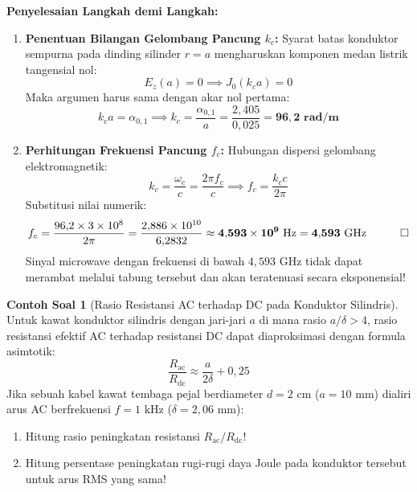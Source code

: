 \documentclass[11pt,a4paper]{article}
\theoremstyle{definition}
\newtheorem{example}{Contoh Soal}[section]
\begin{document}
\noindent\textbf{Penyelesaian Langkah demi Langkah:}
\begin{enumerate}[leftmargin=*]
    \item \textbf{Penentuan Bilangan Gelombang Pancung $k_c$:}
    Syarat batas konduktor sempurna pada dinding silinder $r = a$ mengharuskan komponen medan listrik tangensial nol:
    \begin{equation*}
        E_z(a) = 0 \implies J_0(k_c a) = 0
    \end{equation*}
    Maka argumen harus sama dengan akar nol pertama:
    \begin{equation*}
        k_c a = \alpha_{0,1} \implies k_c = \frac{\alpha_{0,1}}{a} = \frac{2{,}405}{0{,}025} = \mathbf{96{,}2\text{ rad/m}}
    \end{equation*}
    
    \item \textbf{Perhitungan Frekuensi Pancung $f_c$:}
    Hubungan dispersi gelombang elektromagnetik:
    \begin{equation*}
        k_c = \frac{\omega_c}{c} = \frac{2\pi f_c}{c} \implies f_c = \frac{k_c c}{2\pi}
    \end{equation*}
    Substitusi nilai numerik:
    \begin{equation*}
        f_c = \frac{96{,}2 \times 3 \times 10^8}{2\pi} = \frac{2{,}886 \times 10^{10}}{6{,}2832} \approx \mathbf{4{,}593 \times 10^9\text{ Hz} = 4{,}593\text{ GHz}} \quad \qed
    \end{equation*}
    Sinyal microwave dengan frekuensi di bawah $4{,}593\text{ GHz}$ tidak dapat merambat melalui tabung tersebut dan akan teratenuasi secara eksponensial!
\end{enumerate}

\begin{example}[Rasio Resistansi AC terhadap DC pada Konduktor Silindris]
Untuk kawat konduktor silindris dengan jari-jari $a$ di mana rasio $a/\delta > 4$, rasio resistansi efektif AC terhadap resistansi DC dapat diaproksimasi dengan formula asimtotik:
\begin{equation*}
    \frac{R_{\text{ac}}}{R_{\text{dc}}} \approx \frac{a}{2\delta} + 0{,}25
\end{equation*}
Jika sebuah kabel kawat tembaga pejal berdiameter $d = 2\text{ cm}$ ($a = 10\text{ mm}$) dialiri arus AC berfrekuensi $f = 1\text{ kHz}$ ($\delta = 2{,}06\text{ mm}$):
\begin{enumerate}[leftmargin=*]
    \item Hitung rasio peningkatan resistansi $R_{\text{ac}}/R_{\text{dc}}$!
    \item Hitung persentase peningkatan rugi-rugi daya Joule pada konduktor tersebut untuk arus RMS yang sama!
\end{enumerate}
\end{example}
\end{document}
